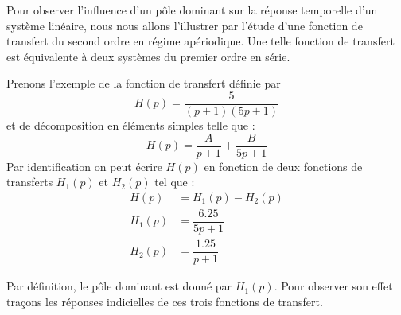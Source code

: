 Pour observer l'influence d'un pôle dominant sur 
la réponse temporelle d'un système linéaire, nous
nous allons l'illustrer par l'étude d'une fonction 
de transfert du second ordre en régime apériodique.
Une telle fonction de transfert est équivalente à deux
systèmes du premier ordre en série.

Prenons l'exemple de la fonction de transfert définie par  
$$
H(p)=\dfrac{5}{(p+1)(5p+1)}
$$
et de décomposition en éléments simples telle que :
$$
H(p)=\dfrac{A}{p+1}+\dfrac{B}{5p+1}
$$
Par identification on peut écrire $H(p)$ en fonction de
deux fonctions de transferts $H_1(p)$ et $H_2(p)$ tel que :
\begin{align*}
	H(p)&=H_1(p)-H_2(p)\\
	H_1(p)&=\dfrac{6.25}{5p+1}\\
	H_2(p)&=\dfrac{1.25}{p+1}
\end{align*}

Par définition, le pôle dominant est donné par $H_1(p)$.
Pour observer son effet traçons les réponses indicielles 
de ces trois fonctions de transfert.

\begin{figure}[!h]
    \centering
    
    \caption{}
\end{figure}

\begin{center}
\end{center}



